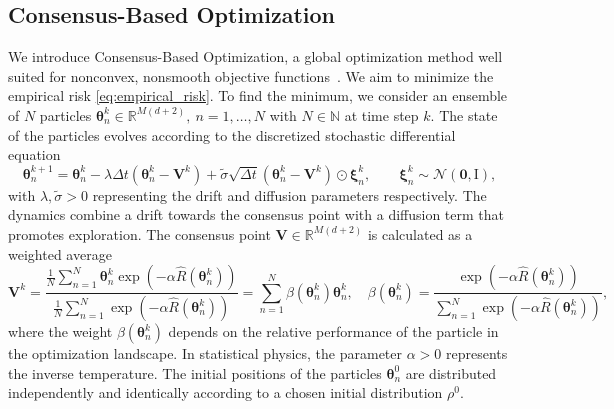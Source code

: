 \documentclass[a4paper, 11pt]{article}
\newcommand{\R}{\mathbb{R}}
\theoremstyle{plain} %
\begin{document}
	\subsection{Consensus-Based Optimization}\label{cbo}
	We introduce Consensus-Based Optimization, a global optimization method well suited for nonconvex, nonsmooth objective functions~\cite{pinnauConsensusbasedModelGlobal2017a}. We aim to minimize the empirical risk \eqref{eq:empirical_risk}. To find the minimum, we consider an ensemble of $ N $ particles $ \bm{\theta}^{k}_{n} \in \R^{M(d+2)},~n=1, \dots, N$ with $ N \in \mathbb{N}$ at time step $ k $. The state of the particles evolves according to the discretized stochastic differential equation 
	\begin{equation}\label{cbo:sde}
		\bm{\theta}_{n}^{k+1} = \bm{\theta}_{n}^{k} -\lambda \Delta t \left(\bm{\theta}_{n}^{k} - \bm{V}^{k} \right) + \tilde{\sigma} \sqrt{\Delta t}\left( \bm{\theta}_{n}^{k} - \bm{V}^{k} \right)\odot\bm{\xi}_{n}^{k}, \qquad \bm{\xi}_{n}^{k} \sim \mathcal{N}\left( \bm{0}, \bm{\mathrm{I}} \right),
	\end{equation} 
	with $ \lambda, \tilde{\sigma} > 0$ representing the drift and diffusion parameters respectively. The dynamics combine a drift towards the consensus point with a diffusion term that promotes exploration. The consensus point $ \bm{V} \in \R^{M(d+2)}$ is calculated as a weighted average
	\begin{equation}\label{cbo:consensus_point}
		\bm{V}^{k} = \frac{\frac{1}{N}\sum_{n=1}^{N}\bm{\theta}^{k}_{n}\exp\left( -\alpha \hat{R}(\bm{\theta}^{k}_{n})\right)}{ \frac{1}{N}\sum_{n=1}^{N}\exp\left( -\alpha \hat{R}(\bm{\theta}^{k}_{n})\right)} = \sum_{n=1}^{N} \beta(\bm{\theta}^{k}_{n}) \bm{\theta}^{k}_{n}, \quad \beta(\bm{\theta}^{k}_{n}) = \frac{\exp(-\alpha \hat{R}(\bm{\theta}^{k}_{n}))}{\sum_{n=1}^{N}\exp(-\alpha \hat{R}(\bm{\theta}^{k}_{n}))},
	\end{equation}
	where the weight $ \beta(\bm{\theta}^{k}_{n}) $  depends on the relative performance of the particle in the optimization landscape. In statistical physics, the parameter $ \alpha > 0 $ represents the inverse temperature. The initial positions of the particles $ \bm{\theta}_{n}^{0} $ are distributed independently and identically according to a chosen initial distribution $ \rho^0 $.
\end{document}
